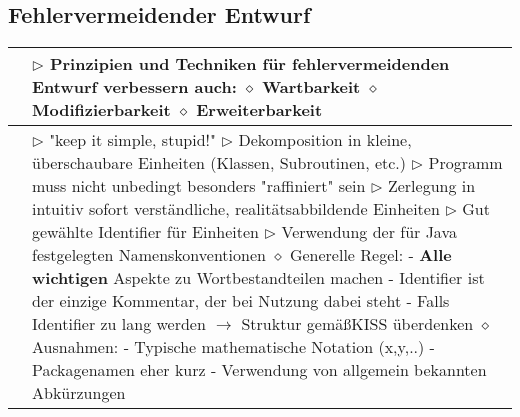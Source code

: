 \subsection*{Fehlervermeidender Entwurf}

	\begin{longtable}{ | p{} p{} | } 
	\hline 
	
	\makecell[l]{Verbesserung} & \makecell[l]{
	$\triangleright$ Prinzipien und Techniken für fehlervermeidenden Entwurf verbessern auch: \\
	\hspace{0.4cm} $\diamond$ Wartbarkeit \\
	\hspace{0.4cm} $\diamond$ Modifizierbarkeit \\
	\hspace{0.4cm} $\diamond$ Erweiterbarkeit  } \\ \hline
	
	\makecell[l]{KISS} & \makecell[l]{
	$\triangleright$ \string"keep it simple, stupid!\string" \\
	$\triangleright$ Dekomposition in kleine, überschaubare Einheiten (Klassen, Subroutinen, etc.) \\
	$\triangleright$ Programm muss nicht unbedingt besonders \string"raffiniert\string" sein \\
	$\triangleright$ Zerlegung in intuitiv sofort verständliche, realitätsabbildende Einheiten \\
	$\triangleright$ Gut gewählte Identifier für Einheiten \\
	$\triangleright$ Verwendung der für Java festgelegten Namenskonventionen \\
	\hspace{0.4cm} $\diamond$ Generelle Regel: \\
	\hspace{0.6cm} - \textbf{Alle wichtigen} Aspekte zu Wortbestandteilen machen \\
	\hspace{0.6cm} - Identifier ist der einzige Kommentar, der bei Nutzung dabei steht \\
	\hspace{0.6cm} - Falls Identifier zu lang werden $\rightarrow$ Struktur gemä\ss KISS überdenken \\
	\hspace{0.4cm} $\diamond$ Ausnahmen: \\
	\hspace{0.6cm} - Typische mathematische Notation (x,y,..) \\
	\hspace{0.6cm} - Packagenamen eher kurz \\
	\hspace{0.6cm} - Verwendung von allgemein bekannten Abkürzungen } \\ \hline


\end{longtable}
